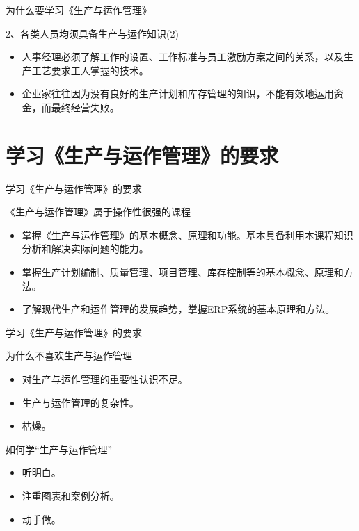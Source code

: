 \documentclass[11pt]{beamer}
\begin{document}
	\begin{frame}{为什么要学习《生产与运作管理》}
		\begin{block}{2、各类人员均须具备生产与运作知识(2)}
			\begin{itemize}
				\item 人事经理必须了解工作的设置、工作标准与员工激励方案之间的关系，以及生产工艺要求工人掌握的技术。
				\item 企业家往往因为没有良好的生产计划和库存管理的知识，不能有效地运用资金，而最终经营失败。
			\end{itemize}  
		\end{block}		
	\end{frame}
	
	\section{学习《生产与运作管理》的要求}
	\begin{frame}{学习《生产与运作管理》的要求}
		\begin{block}{《生产与运作管理》属于操作性很强的课程}
			\begin{itemize}
				\item 掌握《生产与运作管理》的基本概念、原理和功能。基本具备利用本课程知识分析和解决实际问题的能力。
				\item 掌握生产计划编制、质量管理、项目管理、库存控制等的基本概念、原理和方法。
				\item 了解现代生产和运作管理的发展趋势，掌握ERP系统的基本原理和方法。
			\end{itemize}  
		\end{block}		
	\end{frame}
		
	\begin{frame}{学习《生产与运作管理》的要求}
		\begin{block}{为什么不喜欢生产与运作管理}
			\begin{itemize}
				\item 对生产与运作管理的重要性认识不足。
				\item 生产与运作管理的复杂性。
				\item 枯燥。
			\end{itemize}  
		\end{block}	
		\begin{block}{如何学“生产与运作管理”}
			\begin{itemize}
				\item 听明白。
				\item 注重图表和案例分析。
				\item 动手做。
			\end{itemize}  
		\end{block}	
	\end{frame}
	
\end{document}
